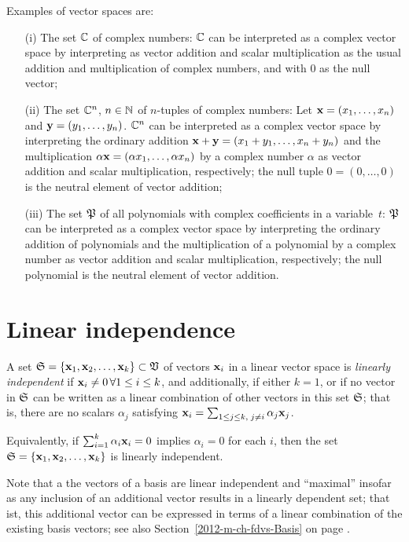 {
\color{blue}
\bexample
Examples of vector spaces are:
\begin{itemize}
\item[(i)]
The set ${\Bbb C}$ of complex numbers: ${\Bbb C}$  can be interpreted as a complex vector space by  interpreting as vector addition and scalar multiplication
as the usual addition and multiplication of complex numbers, and with $0$ as the null vector;
\item[(ii)]
The set ${\Bbb C}^n$, $n \in {\Bbb N}$ of $n$-tuples of complex numbers:
Let
${\bf x}=
(x_1,\ldots , x_n)$
and
${\bf y}=
(y_1,\ldots , y_n)$.
 ${\Bbb C}^n$  can be interpreted as a complex vector space by  interpreting
the ordinary addition  $ {\bf x} + {\bf y} =  (x_1+y_1,\ldots , x_n+y_n)$
and the multiplication $\alpha {\bf x}=
(\alpha  x_1,\ldots ,\alpha  x_n)$ by a complex number $\alpha$ as vector addition
 and scalar multiplication, respectively;
the null tuple $0 =
(0,\ldots ,0)$ is the neutral element of vector addition;
\item[(iii)]
The set ${\frak P}$
 of all polynomials with complex coefficients in a variable~$t$:
${\frak P}$  can be interpreted as a complex vector space by  interpreting
the ordinary addition of polynomials and the multiplication of a polynomial by a complex number as vector addition and scalar multiplication,
respectively;
the null polynomial is the neutral element of vector addition.
\end{itemize}
\eexample
}


\section{Linear independence}

A set ${\frak S}=\{
{\bf x}_1,
{\bf x}_2,
\ldots ,
{\bf x}_k\} \subset {\frak V}$
of vectors ${\bf x}_i$ in a linear vector space
is {\em linearly independent}
if ${\bf x}_i\neq 0\,\forall 1\le i\le k$,
and additionally, if either $k=1$,
or if no vector in ${\frak S}$ can be written as a linear combination of other vectors in this set ${\frak S}$;
that is, there are no scalars $\alpha_j$ satisfying
 ${\bf x}_i=\sum_{1\le j \le k, \; j\neq i}\alpha_j {\bf x}_j$.

Equivalently, if $\sum_{i=1}^k \alpha_i {\bf x}_i = 0$
 implies $\alpha_i =0$ for each $i$, then the set
${\frak S}=\{
{\bf x}_1,
{\bf x}_2,
\ldots ,
{\bf x}_k\}  $ is linearly independent.


Note that a the vectors of a basis are linear independent and ``maximal''
insofar as any inclusion of an additional vector results in a linearly dependent set;
that ist, this additional vector can be expressed in terms of a linear combination of the
existing basis vectors; see also Section~\ref{2012-m-ch-fdvs-Basis} on page \pageref{2012-m-ch-fdvs-Basis}.


